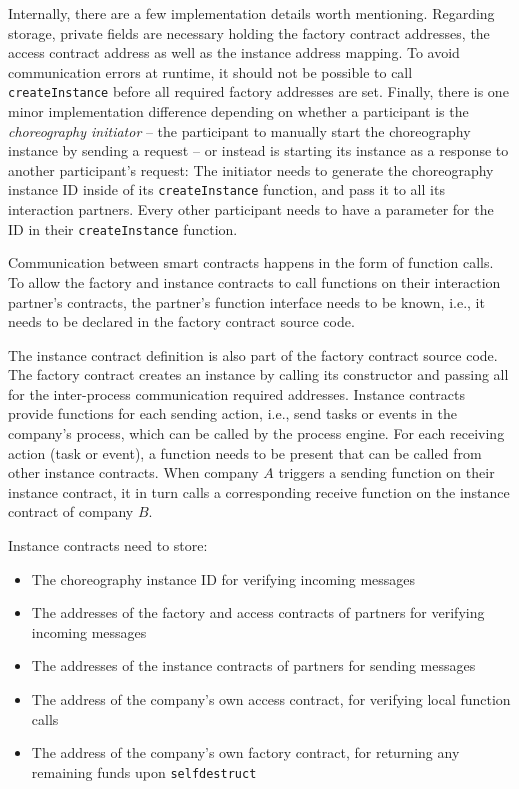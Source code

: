 \documentclass[runningheads]{llncs}
\begin{document}
Internally, there are a few implementation details worth mentioning.
Regarding storage, private fields are necessary holding the factory contract addresses, the access contract address as well as the instance address mapping.
To avoid communication errors at runtime, it should not be possible to call \texttt{createInstance} before all required factory addresses are set.
Finally, there is one minor implementation difference depending on whether a participant is the \textit{choreography initiator} -- the participant to manually start the choreography instance by sending a request -- or instead is starting its instance as a response to another participant's request: %
The initiator needs to generate the choreography instance ID inside of its \texttt{createInstance} function, and pass it to all its interaction partners.
Every other participant needs to have a parameter for the ID in their \texttt{createInstance} function.

Communication between smart contracts happens in the form of function calls.
To allow the factory and instance contracts to call functions on their interaction partner's contracts, the partner's function interface needs to be known, i.e., it needs to be declared in the factory contract source code.

The instance contract definition is also part of the factory contract source code.
The factory contract creates an instance by calling its constructor and passing all for the inter-process communication required addresses.
Instance contracts provide functions for each sending action, i.e., send tasks or events in the company's process, which can be called by the process engine.
For each receiving action (task or event), a function needs to be present that can be called from other instance contracts.
When company $A$ triggers a sending function on their instance contract, it in turn calls a corresponding receive function on the instance contract of company $B$.

Instance contracts need to store:
\begin{itemize}
	\item The choreography instance ID for verifying incoming messages
	\item The addresses of the factory and access contracts of partners for verifying incoming messages
	\item The addresses of the instance contracts of partners for sending messages
	\item The address of the company's own access contract, for verifying local function calls
	\item The address of the company's own factory contract, for returning any remaining funds upon \texttt{selfdestruct}
\end{itemize}
\end{document}
